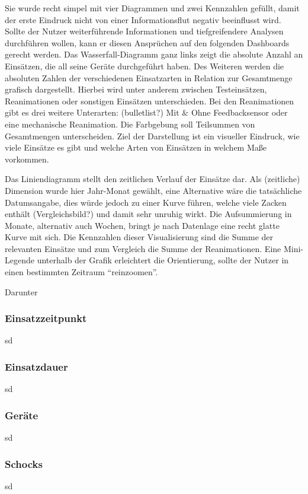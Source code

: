 Sie wurde recht simpel mit vier Diagrammen und zwei Kennzahlen gefüllt, damit der erste Eindruck nicht von einer Informationsflut negativ beeinflusst wird.
Sollte der Nutzer weiterführende Informationen und tiefgreifendere Analysen durchführen wollen, kann er diesen Ansprüchen auf den folgenden Dashboards gerecht werden.
Das Wasserfall-Diagramm ganz links zeigt die absolute Anzahl an Einsätzen, die all seine Geräte durchgeführt haben.
Des Weiteren werden die absoluten Zahlen der verschiedenen Einsatzarten in Relation zur Gesamtmenge grafisch dargestellt.
Hierbei wird unter anderem zwischen Testeinsätzen, Reanimationen oder sonstigen Einsätzen unterschieden.
Bei den Reanimationen gibt es drei weitere Unterarten: (bulletlist?) Mit \& Ohne Feedbacksensor oder eine mechanische Reanimation.
Die Farbgebung soll Teilsummen von Gesamtmengen unterscheiden.
Ziel der Darstellung ist ein visueller Eindruck, wie viele Einsätze es gibt und welche Arten von Einsätzen in welchem Maße vorkommen.

Das Liniendiagramm stellt den zeitlichen Verlauf der Einsätze dar.
Als (zeitliche) Dimension wurde hier Jahr-Monat gewählt, eine Alternative wäre die tatsächliche Datumsangabe, dies würde jedoch zu einer Kurve führen, welche viele Zacken enthält (Vergleichsbild?) und damit sehr unruhig wirkt.
Die Aufsummierung in Monate, alternativ auch Wochen, bringt je nach Datenlage eine recht glatte Kurve mit sich. 
Die Kennzahlen dieser Visualisierung sind die Summe der relevanten Einsätze und zum Vergleich die Summe der Reanimationen. 
Eine Mini-Legende unterhalb der Grafik erleichtert die Orientierung, sollte der Nutzer in einen bestimmten Zeitraum "`reinzoomen"'.


Darunter

\subsubsection{Einsatzzeitpunkt}
sd
\subsubsection{Einsatzdauer}
sd
\subsubsection{Geräte}
sd
\subsubsection{Schocks}
sd
